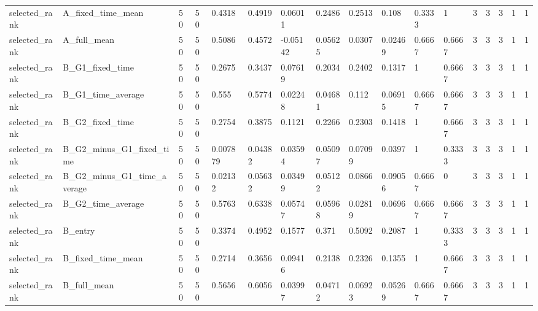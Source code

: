 \begin{longtable}{lllllllllllllllll}
selected\_rank & A\_fixed\_time\_mean & 50 & 50 & 0.4318 & 0.4919 & 0.06011 & 0.2486 & 0.2513 & 0.108 & 0.3333 & 1 & 3 & 3 & 3 & 1 & 1 \\
selected\_rank & A\_full\_mean & 50 & 50 & 0.5086 & 0.4572 & -0.05142 & 0.05625 & 0.0307 & 0.02469 & 0.6667 & 0.6667 & 3 & 3 & 3 & 1 & 1 \\
selected\_rank & B\_G1\_fixed\_time & 50 & 50 & 0.2675 & 0.3437 & 0.07619 & 0.2034 & 0.2402 & 0.1317 & 1 & 0.6667 & 3 & 3 & 3 & 1 & 1 \\
selected\_rank & B\_G1\_time\_average & 50 & 50 & 0.555 & 0.5774 & 0.02248 & 0.04681 & 0.112 & 0.06915 & 0.6667 & 0.6667 & 3 & 3 & 3 & 1 & 1 \\
selected\_rank & B\_G2\_fixed\_time & 50 & 50 & 0.2754 & 0.3875 & 0.1121 & 0.2266 & 0.2303 & 0.1418 & 1 & 0.6667 & 3 & 3 & 3 & 1 & 1 \\
selected\_rank & B\_G2\_minus\_G1\_fixed\_time & 50 & 50 & 0.007879 & 0.04382 & 0.03594 & 0.05097 & 0.07099 & 0.0397 & 1 & 0.3333 & 3 & 3 & 3 & 1 & 1 \\
selected\_rank & B\_G2\_minus\_G1\_time\_average & 50 & 50 & 0.02132 & 0.05632 & 0.03499 & 0.05122 & 0.0866 & 0.09056 & 0.6667 & 0 & 3 & 3 & 3 & 1 & 1 \\
selected\_rank & B\_G2\_time\_average & 50 & 50 & 0.5763 & 0.6338 & 0.05747 & 0.05968 & 0.02819 & 0.0696 & 0.6667 & 0.6667 & 3 & 3 & 3 & 1 & 1 \\
selected\_rank & B\_entry & 50 & 50 & 0.3374 & 0.4952 & 0.1577 & 0.371 & 0.5092 & 0.2087 & 1 & 0.3333 & 3 & 3 & 3 & 1 & 1 \\
selected\_rank & B\_fixed\_time\_mean & 50 & 50 & 0.2714 & 0.3656 & 0.09416 & 0.2138 & 0.2326 & 0.1355 & 1 & 0.6667 & 3 & 3 & 3 & 1 & 1 \\
selected\_rank & B\_full\_mean & 50 & 50 & 0.5656 & 0.6056 & 0.03997 & 0.04712 & 0.06923 & 0.05269 & 0.6667 & 0.6667 & 3 & 3 & 3 & 1 & 1 \\
\bottomrule
\end{longtable}
\endgroup
